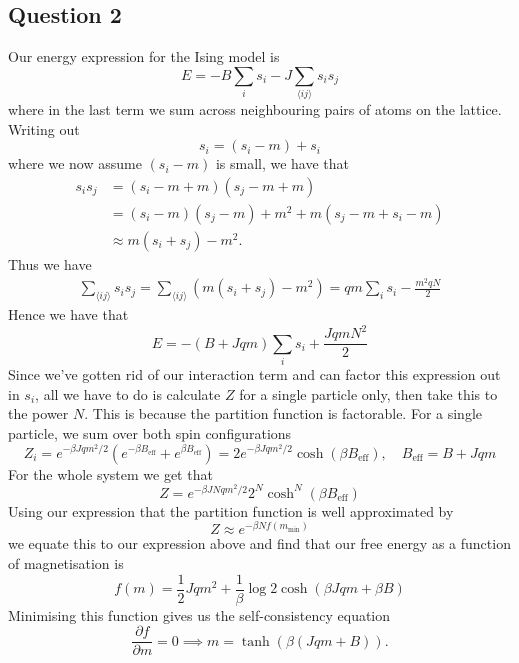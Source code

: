 \subsection{Question 2}
Our energy expression for the Ising model is
\[
	E = - B \sum_i s_i - J\sum_{\langle i j \rangle} s_i s_j
\]
where in the last term we sum across neighbouring pairs of atoms on the lattice. Writing out 
\[ 
	s_i  = (s_i - m) + s_i
\]
where we now assume $(s_i - m)$ is small, we have that 
\begin{align*}
	s_i s_j &= \left( s_i - m + m \right) \left( s_j - m + m \right) \\
		   &= (s_i -m)(s_j - m) + m^2  + m (s_ j - m  + s_i  - m ) \\
		   &\approx m (s_i + s_j) - m^2. 
\end{align*}
Thus we have 
\begin{align*}
	\sum_{\langle ij \rangle} s_i s_j = \sum_{\langle i j \rangle} \left( m (s_i + s_j) - m^2 \right)  = q m \sum_i {s_i}- \frac{m^2 q N }{2}
\end{align*}
Hence we have that 
\[ 
	E = - (B + J qm )\sum_i s_i  + \frac{J q m N^2}{2}
\]
Since we've gotten rid of our interaction term and can factor this expression out in $s_i$, all we have to do is calculate $Z$ for a single particle only, then take this to the power $N$. This is because the partition function is factorable. For a single particle, we sum over both spin configurations
\[ 
	Z_i = e^{ -\beta J q m^2 / 2} \left( e^ { - \beta B_{\text{eff}}} + e^{\beta B_{\text{eff}}} \right) = 2 e^{ -\beta J q m^2 / 2} \cosh (\beta B_{\text{eff}}), \quad B_{\text{eff}} = B + J q m
\]
For the whole system we get that 
\[ 
	Z = e^{ -\beta J N q m^2 / 2}2^N \cosh^N  (\beta B_{\text{eff}})
\]
Using our expression that the partition function is well approximated by 
\[ 
	Z \approx e^{- \beta N f(m_{\min})}
\]
we equate this to our expression above and find that our free energy as a function of magnetisation is 
\[ 
	f(m) = \frac{1}{2}J q m^2 + \frac{1}{\beta} \log{2 \cosh ( {\beta J qm + \beta B }) }
\]
Minimising this function gives us the self-consistency equation 
\[ 
	\frac{\partial f }{\partial m } = 0 \implies m = \tanh (\beta(J qm + B)). 
\]

\pagebreak 

